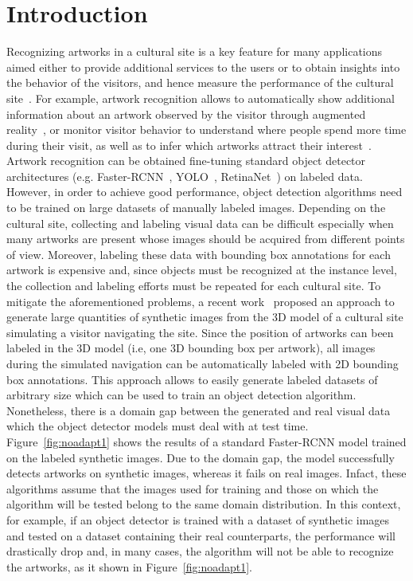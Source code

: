\documentclass[preprint]{elsarticle}
\begin{document}
\section{Introduction}
Recognizing artworks in a cultural site is a key feature for many applications aimed either to provide additional services to the users or to obtain insights into the behavior of the visitors, and hence measure the performance of the cultural site~\cite{Ragusa_2020}. For example, artwork recognition allows to automatically show additional information about an artwork observed by the visitor through augmented reality~\cite{10.1145/3092832}, or monitor visitor behavior to understand where people spend more time during their visit, as well as to infer which artworks attract their interest~\cite{ragusa2019egocentricpoint}. Artwork recognition can be obtained fine-tuning standard object detector architectures (e.g. Faster-RCNN~\cite{DBLP:journals/corr/RenHG015}, YOLO~\cite{7780460}, RetinaNet~\cite{DBLP:journals/corr/abs-1708-02002}) on labeled data. However, in order to achieve good performance, object detection algorithms need to be trained on large datasets of manually labeled images. Depending on the cultural site, collecting and labeling visual data can be difficult especially when many artworks are present whose images should be acquired from different points of view. Moreover, labeling these data with bounding box annotations for each artwork is expensive and, since objects must be recognized at the instance level, the collection and labeling efforts must be repeated for each cultural site. \newline
To mitigate the aforementioned problems, a recent work~\cite{orlando2020egocentric} proposed an approach to generate large quantities of synthetic images from the 3D model of a cultural site simulating a visitor navigating the site. Since the position of artworks can been labeled in the 3D model (i.e, one 3D bounding box per artwork), all images during the simulated navigation can be automatically labeled with 2D bounding box annotations. This approach allows to easily generate labeled datasets of arbitrary size which can be used to train an object detection algorithm. Nonetheless, there is a domain gap between the generated and real visual data which the object detector models must deal with at test time. Figure~\ref{fig:noadapt1} shows  the  results  of  a  standard  Faster-RCNN  model  trained  on  the labeled synthetic images.  Due to the domain gap,  the model successfully detects artworks on synthetic images, whereas it fails on real images. Infact, these algorithms assume that the images used for training and those on which the algorithm will be tested belong to the same domain distribution. In this context, for example, if an object detector is trained with a dataset of synthetic images and tested on a dataset containing their real counterparts, the performance will drastically drop and, in many cases, the algorithm will not be able to recognize the artworks, as it shown in Figure~\ref{fig:noadapt1}.
\end{document}
